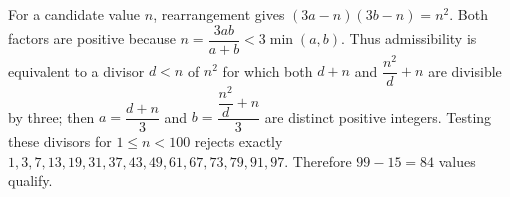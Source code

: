 For a candidate value $n$, rearrangement gives $(3a-n)(3b-n)=n^2$. Both factors are positive because $n=\dfrac{3ab}{a+b}<3\min(a,b)$. Thus admissibility is equivalent to a divisor $d<n$ of $n^2$ for which both $d+n$ and $\dfrac{n^2}{d}+n$ are divisible by three; then $a=\dfrac{d+n}{3}$ and $b=\dfrac{\dfrac{n^2}{d}+n}{3}$ are distinct positive integers. Testing these divisors for $1\le n<100$ rejects exactly $1,3,7,13,19,31,37,43,49,61,67,73,79,91,97$. Therefore $99-15=\boxed{84}$ values qualify.
